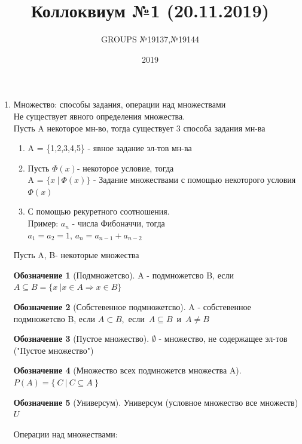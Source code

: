\documentclass[a4paper]{article}
\title{ Коллоквиум №1 (20.11.2019) }
\author{GROUPS №19137,№19144}
\date{2019\\}
\theoremstyle{definition}
\newtheorem*{name}{Обозначение}
\begin{document}
\maketitle
\begin{enumerate}
 \item Множество: способы задания, операции над множествами
       \\ Не существует явного определения множества.
       \\ Пусть A некоторое мн-во, тогда существует 3 способа задания мн-ва
       \begin{enumerate}
        \item A = \{1,2,3,4,5\} - явное задание эл-тов мн-ва \\
        \item Пусть $\Phi(x)$- некоторое условие, тогда \\A = $\{x \ | \ \Phi(x) \}$ - Задание множествами с помощью некоторого условия $\Phi(x)$
        \item С помощью рекуретного соотношения.\\
              Пример: $a_n$ - числа Фибоначчи, тогда \\
              $a_1=a_2=1$, $a_n = a_{n-1}+a_{n-2}$
       \end{enumerate}
       Пусть A, B- некоторые множества \\
       \begin{name}[Подмножетсво]
        A - подмножетсво B, если\\
        \mbox{$A \subseteq B = \{x \ | x\in{A} \Rightarrow x\in{B} \}$}
       \end{name}
       \begin{name}[Собстевенное подмножетсво]
        A - собстевенное подмножетсво B, если
        \mbox{$A \subset B$, если $A \subseteq B$ и $A\ne{B} $}
       \end{name}
       \begin{name}[Пустое множество]
        $\emptyset$ - множество, не содержащее эл-тов ("Пустое множество")
       \end{name}
       \begin{name}[Множество всех подмножетсв множества A]
        \mbox{}\\
        \mbox{$P(A) = \{ \ C\ |\ C \subseteq{A} \ \} $}
       \end{name}
       \begin{name}[Универсум]
        Универсум (условное множество все множеств) $U$
       \end{name}
       Операции над множествами:

\end{enumerate}
\end{document}
